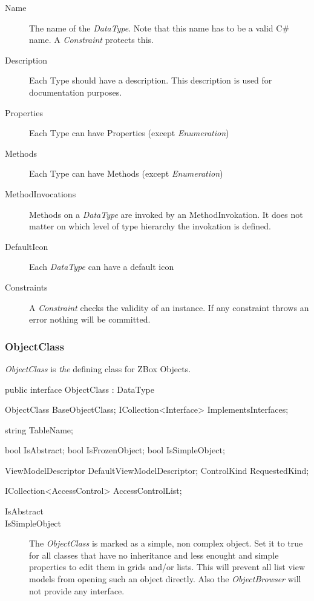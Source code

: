 \begin{description}
\item[Name] { The name of the \emph{DataType}. Note that this name has to be a
valid C\# name. A \emph{Constraint} protects this. }
\item[Description] { Each Type should have a description. This description is
used for documentation purposes. }
\item[Properties] { Each Type can have Properties (except \emph{Enumeration})}
\item[Methods] { Each Type can have Methods (except \emph{Enumeration})}
\item[MethodInvocations] { Methods on a \emph{DataType} are invoked by an
MethodInvokation. It does not matter on which level of type hierarchy the
invokation is defined. }
\item[DefaultIcon] { Each \emph{DataType} can have a default icon}
\item[Constraints] { A \emph{Constraint} checks the validity of an instance. If
any constraint throws an error nothing will be committed. }
\end{description}

\subsubsection{ObjectClass}
\emph{ObjectClass} is \emph{the} defining class for ZBox Objects.

\begin{CS}
public interface ObjectClass : DataType 
{
    ObjectClass BaseObjectClass;
    ICollection<Interface> ImplementsInterfaces;

    string TableName;

    bool IsAbstract;
    bool IsFrozenObject;
    bool IsSimpleObject;

    ViewModelDescriptor DefaultViewModelDescriptor;
    ControlKind RequestedKind;

    ICollection<AccessControl> AccessControlList;
}
\end{CS}

\begin{description}
\item[IsAbstract]
\item[IsSimpleObject] The \emph{ObjectClass} is marked as a simple, non complex
object. Set it to true for all classes that have no inheritance and less
enought and simple properties to edit them in grids and/or lists. This will
prevent all list view models from opening such an object directly. Also the \emph{ObjectBrowser} will not provide any interface.
\end{description}


